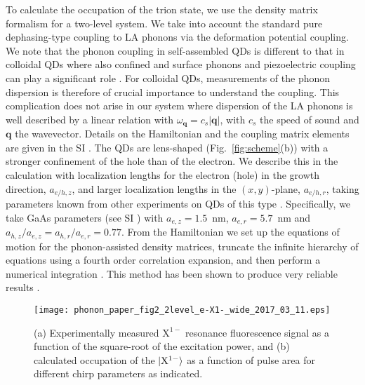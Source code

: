 \documentclass[aps,prl,reprint,superscriptaddress]{revtex4-1}
\begin{document}
To calculate the occupation of the trion state, we use the density matrix formalism for a two-level system. We take into account the standard pure dephasing-type coupling to LA phonons via the deformation potential coupling. We note that the phonon coupling in self-assembled QDs is different to that in colloidal QDs where also confined and surface phonons and piezoelectric coupling can play a significant role \cite{Tyagi2010, Sagar2008}. For colloidal QDs, measurements of the phonon dispersion is therefore of crucial importance to understand the coupling. This complication does not arise in our system where dispersion of the LA phonons is well described by a linear relation
 with $\omega_{\mathbf{q}}=c_s |\mathbf{q}|$, with $c_s$ the speed of sound and $\mathbf{q}$ the wavevector. Details on the Hamiltonian and the coupling matrix elements are given in the SI \cite{SI}. The QDs are lens-shaped (Fig.\ \ref{fig:scheme}(b)) with a stronger confinement of the hole than of the electron. We describe this in the calculation with localization lengths for the electron (hole) in the growth direction, $a_{e/h,z}$, and larger localization lengths in the $(x,y)$-plane, $a_{e/h,r}$, taking parameters known from other experiments on QDs of this type \cite{SI}. Specifically, we take GaAs parameters (see SI \cite{SI}) with $a_{e,z}=1.5$~nm, $a_{e,r}= 5.7$~nm and $a_{h,z}/a_{e,z}=a_{h,r}/a_{e,r}=0.77$. From the Hamiltonian \cite{SI} we set up the equations of motion for the phonon-assisted density matrices, truncate the infinite hierarchy of equations using a fourth order correlation expansion, and then perform a numerical integration \cite{Luker2012,Reiter2014,krugel2006bac}. This method has been shown to produce very reliable results \cite{Luker2012,Reiter2014}. 

\begin{figure}[t]{}
	\centering
	\texttt{[image: phonon\_paper\_fig2\_2level\_e-X1-\_wide\_2017\_03\_11.eps]}
	\caption{(a) Experimentally measured $\mathrm{X}^{1-}$ resonance fluorescence signal as a function of the square-root of the excitation power, and (b) calculated occupation of the $\ket{\mathrm{X}^{1-}}$ as a function of pulse area for different chirp parameters as indicated.
	}
	\label{fig:fig2}
\end{figure}
\end{document}
